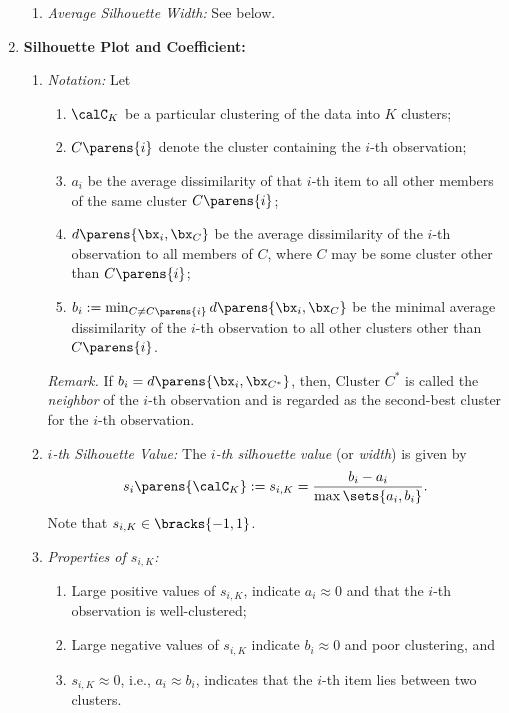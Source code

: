 \documentclass[12pt]{article}
\begin{document}
\begin{enumerate}[label=\textbf{\arabic*.}]
\begin{enumerate}
		\item \textit{Average Silhouette Width:} See below. 
		
	\end{enumerate}
	
	\item \textbf{Silhouette Plot and Coefficient:} 
	\begin{enumerate}
		\item \textit{Notation:} Let 
		\begin{enumerate}
			\item $\calC_K$ be a particular clustering of the data into $K$ clusters; 
			\item $C \parens{i}$ denote the cluster containing the $i$-th observation; 
			\item $a_i$ be the average dissimilarity of that $i$-th item to all other members of the same cluster $C \parens{i}$; 
			\item $d \parens{\bx_i, \bx_C}$ be the average dissimilarity of the $i$-th observation to all members of $C$, where $C$ may be some cluster other than $C \parens{i}$; 
			\item $b_i := \min_{C \neq C \parens{i}} d \parens{\bx_i, \bx_C}$ be the minimal average dissimilarity of the $i$-th observation to all other clusters other than $C \parens{i}$. 
		\end{enumerate}
		
		\textit{Remark.} If $b_i = d \parens{\bx_i, \bx_{C^*}}$, then, Cluster $C^*$ is called the \emph{neighbor} of the $i$-th observation and is regarded as the second-best cluster for the $i$-th observation. 
		
		\item \textit{$i$-th Silhouette Value:} The \emph{$i$-th silhouette value} (or \emph{width}) is given by 
		\begin{align}
			s_i \parens{\calC_K} := s_{i, K} = \frac{b_i - a_i}{\max \sets{a_i, b_i}}. 
		\end{align}
		Note that $s_{i, K} \in \bracks{-1, 1}$. 
		
		\item \textit{Properties of $s_{i, K}$:} 
		\begin{enumerate}
			\item Large positive values of $s_{i, K}$, indicate $a_i \approx 0$ and that the $i$-th observation is well-clustered; 
			\item Large negative values of $s_{i, K}$ indicate $b_i \approx 0$ and poor clustering, and 
			\item $s_{i, K} \approx 0$, i.e., $a_i \approx b_i$, indicates that the $i$-th item lies between two clusters. 
		\end{enumerate}
		

\end{enumerate}
\end{enumerate}
\end{document}
